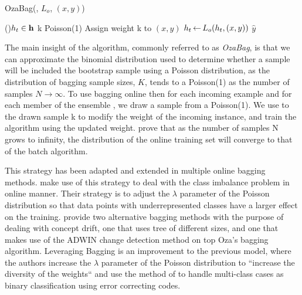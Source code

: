 \begin{algorithm}
	\small
	\caption{OzaBag(\ensemble, $L_o$, $(x,y)$)}
	\label{alg:ozabag}

	\ForEach(){$h_t \in \mathbf{h}$}{
		k  Poisson(1) \;
		Assign weight k to $(x,y)$ \;
		$h_t {\,\leftarrow\,} L_o(h_t, (x,y))$
	}
	\Return $\widehat{y}$ \;
\end{algorithm}

The main insight of the algorithm, commonly referred to as \emph{OzaBag}, is that we can approximate the binomial distribution
used to determine whether a sample will be included the bootstrap
sample using a Poisson distribution, as the distribution of bagging sample sizes, $K$, tends
to a Poisson(1) as the number of samples $N \rightarrow \infty$. To use bagging online then
for each incoming example and
for each member of the ensemble \ensemble, we draw a sample from a Poisson(1). We use to the drawn sample k to modify the weight of the incoming instance, and train the algorithm using the updated weight. \citet{Oza2001online} prove that as the number of samples N grows
to infinity, the distribution of the online training set will converge to that of the batch algorithm.

This strategy has been adapted and extended in multiple online bagging methods. \citet{online-bag-imbalance}
make use of this strategy to deal with the class imbalance problem in online manner. Their strategy
is to adjust the $\lambda$ parameter of the Poisson distribution so that data points with underrepresented
classes have a larger effect on the training. \citet{new-ensemble-methods} provide two alternative
bagging methods with the purpose of dealing with concept drift, one that uses tree of different
sizes, and one that makes use of the ADWIN \cite{adwin} change detection method on top Oza's bagging algorithm. Leveraging Bagging \cite{leveraging-bagging} is an improvement to the previous model,
where the authors increase the $\lambda$ parameter of the Poisson distribution to ``increase the diversity of the weights`` and use the method of \citet{multiclass-codes} to handle multi-class cases
as binary classification using error correcting codes.

